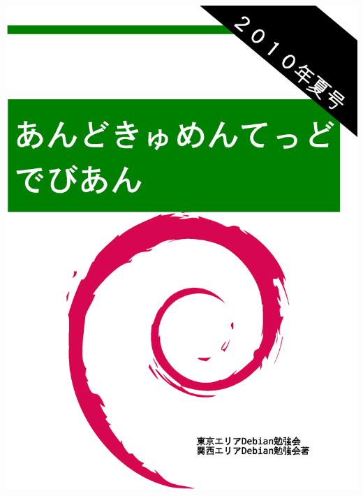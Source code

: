 \documentclass[mingoth,a4paper]{jsarticle}
\begin{document}
\begin{titlepage}
\includegraphics[height=252mm]{image2010-natsu/2010-summer.eps}
\end{titlepage}

\newpage
\end{document}
